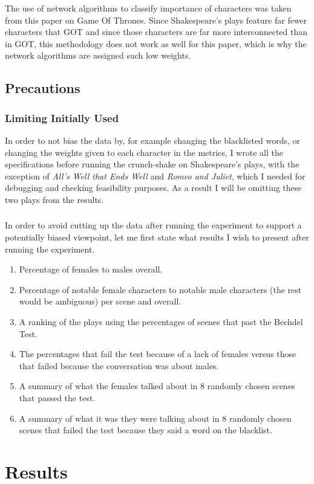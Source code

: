 \documentclass[12pt]{article}
\begin{document}
The use of network algorithms to classify importance of characters was taken
from this paper on Game Of Thrones. Since Shakespeare's plays feature far fewer
characters that GOT and since those characters are far more interconnected than
in GOT, this methodology does not work as well for this paper, which is why the
network algorithms are assigned such low weights.

\subsection{Precautions}
\label{sub:passing_the_criteria}

\subsubsection{Limiting Initially Used}

In order to not bias the data by, for example changing the blacklisted
words, or changing the weights given to each character in the metrics, I wrote
all the specifications before running the crunch-shake on Shakespeare's plays,
with the exception of \emph{All's Well that Ends Well} and \emph{Romeo and
Juliet}, which I needed for debugging and checking feasibility purposes. As a
result I will be omitting these two plays from the results. 

\subsubsection{}

In order to avoid cutting up the data after running the experiment to support
a potentially biased viewpoint, let me first state what results I wish to present
after running the experiment.

\begin{enumerate}
    \item Percentage of females to males overall.
    \item Percentage of notable female characters to notable male characters
        (the rest would be ambiguous) per scene and overall.
    \item A ranking of the plays using the percentages of scenes that past the
        Bechdel Test.
    \item The percentages that fail the test because of a lack of females versus
        those that failed because the conversation was about males.
    \item A summary of what the females talked about in 8 randomly chosen
        scenes that passed the test. 
    \item A summary of what it was they were talking about in 8 randomly chosen
        scenes that failed the test because they said a word on the blacklist.
\end{enumerate}


\section{Results}
\label{sec:results}
\end{document}

